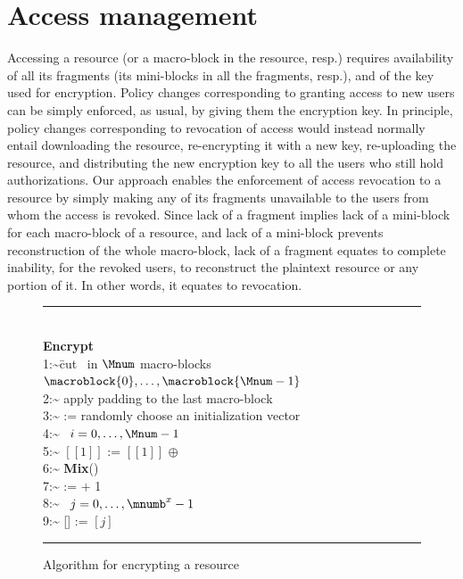 \section{Access management}\label{ms:sec:revoke}

Accessing a resource (or a macro-block in the resource, resp.) requires availability of all its fragments (its mini-blocks in all the fragments, resp.), and of the key used for encryption. Policy changes corresponding to granting access to new users can be simply enforced, as usual, by giving them the encryption key. In principle, policy changes corresponding to revocation of access would instead normally entail downloading the resource, re-encrypting it with a new key, re-uploading the resource, and distributing the new encryption key to all the users who still hold authorizations. Our approach enables the enforcement of access revocation to a resource by simply making any of its fragments unavailable to the users from whom the access is revoked. Since lack of a fragment implies lack of a mini-block for each macro-block of a resource, and lack of a mini-block prevents reconstruction of the whole macro-block, lack of a fragment equates to complete inability, for the revoked users, to reconstruct the plaintext resource or any portion of it. In other words, it equates to revocation.

\begin{figure}[!t]
\begin{footnotesize}
\hrule          %
\begin{tabbing}
\hfill\\
{\bf Encrypt}\\[1em]
\num{1:~}\= cut \resource\ in $\Mnum$ macro-blocks $\macroblock{0},\ldots,\macroblock{\Mnum-1}$\\[0.3em]
\num{2:~}\1 apply padding to the last macro-block \\[0.3em]
\num{3:~}\1  := randomly choose an initialization vector\\[0.3em]
\num{4:~}\1 \myfor\ $i=0,\ldots,\Mnum-1$  \\[0.3em]
\num{5:~}\2     $[[1]]$ := $[[1]]$ $\oplus$  \\[0.3em]
\num{6:~}\2     {\bf Mix}() \\[0.3em]
\num{7:~}\2      :=  $+$ 1 \\[0.3em]
\num{8:~}\2     \myfor\ $j=0,\ldots,\mnumb^x-1$  \\[0.3em]
\num{9:~}\3         [] := $[j]$
\end{tabbing}
\hrule
\vspace{.5em}
\end{footnotesize}
\caption{\label{ms:fig:algoenc}Algorithm for encrypting a resource \resource}
\end{figure}

